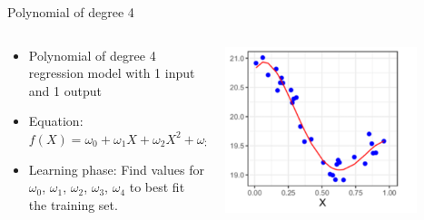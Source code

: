 \begin{frame}{Polynomial of degree 4}
  \begin{columns}
    \begin{column}{0.5\textwidth}
  \begin{itemize}
    \item Polynomial of degree 4 regression model with 1 input and 1 output
    \item Equation: $f(X) = \omega_0 + \omega_1 X + \omega_2 X^2 + \omega_3 X^3 + \omega_4 X^4$
    \item Learning phase: Find values for $\omega_0$, $\omega_1$, $\omega_2$, $\omega_3$, $\omega_4$ to best fit the training set.
  \end{itemize}
\end{column}
\begin{column}{0.5\textwidth}
  \includegraphics[width=0.8\textwidth]{images/pm4.png}
\end{column}
\end{columns}
\end{frame}

